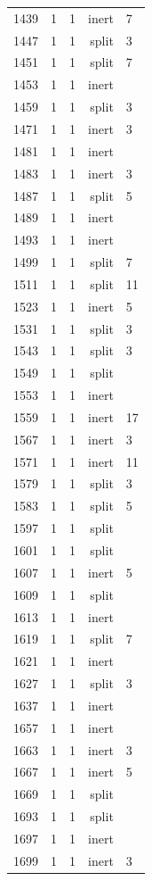 \begin{longtable}{rrrrl}
1439 & 1 & 1 & inert & 7 \\
1447 & 1 & 1 & split & 3 \\
1451 & 1 & 1 & split & 7 \\
1453 & 1 & 1 & inert &  \\
1459 & 1 & 1 & split & 3 \\
1471 & 1 & 1 & inert & 3 \\
1481 & 1 & 1 & inert &  \\
1483 & 1 & 1 & inert & 3 \\
1487 & 1 & 1 & split & 5 \\
1489 & 1 & 1 & inert &  \\
1493 & 1 & 1 & inert &  \\
1499 & 1 & 1 & split & 7 \\
1511 & 1 & 1 & split & 11 \\
1523 & 1 & 1 & inert & 5 \\
1531 & 1 & 1 & split & 3 \\
1543 & 1 & 1 & split & 3 \\
1549 & 1 & 1 & split &  \\
1553 & 1 & 1 & inert &  \\
1559 & 1 & 1 & inert & 17 \\
1567 & 1 & 1 & inert & 3 \\
1571 & 1 & 1 & inert & 11 \\
1579 & 1 & 1 & split & 3 \\
1583 & 1 & 1 & split & 5 \\
1597 & 1 & 1 & split &  \\
1601 & 1 & 1 & split &  \\
1607 & 1 & 1 & inert & 5 \\
1609 & 1 & 1 & split &  \\
1613 & 1 & 1 & inert &  \\
1619 & 1 & 1 & split & 7 \\
1621 & 1 & 1 & inert &  \\
1627 & 1 & 1 & split & 3 \\
1637 & 1 & 1 & inert &  \\
1657 & 1 & 1 & inert &  \\
1663 & 1 & 1 & inert & 3 \\
1667 & 1 & 1 & inert & 5 \\
1669 & 1 & 1 & split &  \\
1693 & 1 & 1 & split &  \\
1697 & 1 & 1 & inert &  \\
1699 & 1 & 1 & inert & 3 \\

\end{longtable}
